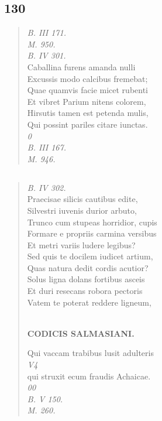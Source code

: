 \documentclass[11pt, a4paper]{report}
\begin{document}
            \subsection*{130}
      \begin{verse}
      \textit{B. III 171.} \\ \textit{M. 950.} \\ \textit{B. IV 301.} \\ Caballina furens amanda nulli \\ Excussis modo calcibus fremebat; \\ Quae quamvis facie micet rubenti \\ Et vibret Parium nitens colorem, \\ Hirsutis tamen est petenda mulis, \\ Qui possint pariles citare iunctas. \\ \textit{0} \\ \textit{B. III 167.} \\ \textit{M. 946.} \\ 
      \end{verse}
  
            \subsection*{}
      \begin{verse}
      \textit{B. IV 302.} \\ Praecisae silicis cautibus edite, \\ Silvestri iuvenis durior arbuto, \\ Trunco cum stupeas horridior, cupis \\ Formare  \lbrack e propriis carmina versibus \\ Et metri variis ludere legibus? \\ Sed quis te docilem iudicet artium, \\ Quas natura dedit cordis acutior? \\ Solus ligna dolans fortibus asceis \\ Et duri resecans robora pectoris \\ Vatem te poterat reddere ligneum, \\ 
        ﻿\pagebreak 
    \begin{center} \textbf{CODICIS SALMASIANI.} \end{center} \marginpar{[139]} Qui vaccam trabibus lusit adulteris \\ \textit{V4} \\ qui struxit ecum fraudis Achaicae. \\ \textit{00} \\ \textit{B. V 150.} \\ \textit{M. 260.} \\ 
      \end{verse}
  
\end{document}
